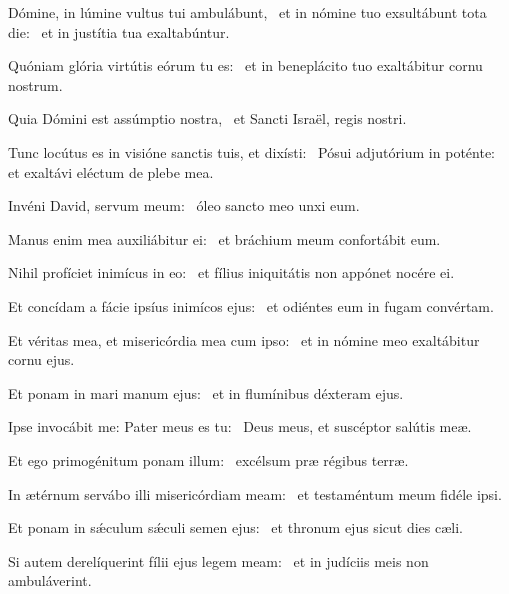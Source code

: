 \item Dómine, in lúmine vultus tui ambulábunt,~\pscross{} et in nómine tuo exsultábunt tota die:~\psstar{} et in justítia tua exaltabúntur.

\item Quóniam glória virtútis eórum tu es:~\psstar{} et in beneplácito tuo exaltábitur cornu nostrum.

\item Quia Dómini est assúmptio nostra,~\psstar{} et Sancti Israël, regis nostri.

\item Tunc locútus es in visióne sanctis tuis, et dixísti:~\pscross{} Pósui adjutórium in poténte:~\psstar{} et exaltávi eléctum de plebe mea.

\item Invéni David, servum meum:~\psstar{} óleo sancto meo unxi eum.

\item Manus enim mea auxiliábitur ei:~\psstar{} et bráchium meum confortábit eum.

\item Nihil profíciet inimícus in eo:~\psstar{} et fílius iniquitátis non appónet nocére ei.

\item Et concídam a fácie ipsíus inimícos ejus:~\psstar{} et odiéntes eum in fugam convértam.

\item Et véritas mea, et misericórdia mea cum ipso:~\psstar{} et in nómine meo exaltábitur cornu ejus.

\item Et ponam in mari manum ejus:~\psstar{} et in flumínibus déxteram ejus.

\item Ipse invocábit me: Pater meus es tu:~\psstar{} Deus meus, et suscéptor salútis meæ.

\item Et ego primogénitum ponam illum:~\psstar{} excélsum præ régibus terræ.

\item In ætérnum servábo illi misericórdiam meam:~\psstar{} et testaméntum meum fidéle ipsi.

\item Et ponam in sǽculum sǽculi semen ejus:~\psstar{} et thronum ejus sicut dies cæli.

\item Si autem derelíquerint fílii ejus legem meam:~\psstar{} et in judíciis meis non ambuláverint.

